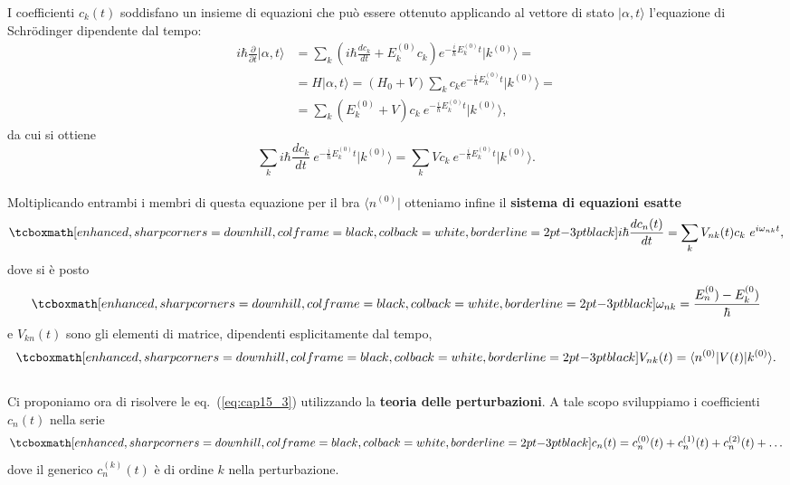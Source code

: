 I coefficienti $c_k (t)$ soddisfano un insieme di equazioni che può essere ottenuto applicando al vettore di stato $\vert \alpha , t \rangle $ l'equazione di Schr\"{o}dinger dipendente dal tempo:
	\begin{align}
		i\hbar \frac{\partial}{\partial t} \vert \alpha , t \rangle &= \sum _ k \left( i\hbar \frac{dc_k}{dt}+ E_k ^{(0)} c_k\right)e^{-\frac{i}{\hbar}E_k ^{(0)} t } \vert k ^{(0)} \rangle =\nonumber \\
		&=  H\vert \alpha , t \rangle  = \left( H_0 + V\right)\sum _k c_ke^{-\frac{i}{\hbar}E_k ^{(0)} t } \vert k ^{(0)} \rangle  = \nonumber \\
		&=   \sum _k \left( E_k ^{(0)}+ V\right)c_k\ e^{-\frac{i}{\hbar}E_k ^{(0)} t } \vert k ^{(0)} \rangle ,
	\end{align}
da cui si ottiene
\begin{equation}
\sum _ k i\hbar \frac{dc_k}{dt} \ e^{-\frac{i}{\hbar}E_k ^{(0)} t } \vert k ^{(0)} \rangle = \sum _ k V c_k\ e^{-\frac{i}{\hbar}E_k ^{(0)} t } \vert k ^{(0)} \rangle .
\end{equation}\\

Moltiplicando entrambi i membri di questa equazione per il bra $\langle n^{(0)} \vert$ otteniamo infine il \textbf{sistema di equazioni esatte}
	\begin{equation}
		\tcboxmath[enhanced, sharp corners=downhill, colframe=black, colback=white, borderline={2pt}{-3pt}{black}]{
			i\hbar \frac{dc_n (t)}{dt} = \sum _ k V_{nk} (t) c_k\ e^{i\omega _{nk}t } ,
			}
	\label{eq:cap15_3}
	\end{equation}
dove si è posto
	\begin{equation}
		\tcboxmath[enhanced, sharp corners=downhill, colframe=black, colback=white, borderline={2pt}{-3pt}{black}]{
			\omega _{nk} = \frac{E_n ^{(0})-E_k ^{(0})}{\hbar}
			}
	\end{equation}
e $V_{kn} (t)$ sono gli elementi di matrice, dipendenti esplicitamente dal tempo,
	\begin{equation}
		\tcboxmath[enhanced, sharp corners=downhill, colframe=black, colback=white, borderline={2pt}{-3pt}{black}]{
			V_{nk} (t) = \langle n ^{(0)} \vert V(t) \vert k ^{(0)} \rangle .
			}
	\end{equation}\\
	
Ci proponiamo ora di risolvere le eq.~(\ref{eq:cap15_3}) utilizzando la \textbf{teoria delle perturbazioni}. A tale scopo sviluppiamo i coefficienti $c_n (t)$ nella serie
	\begin{equation}
		\tcboxmath[enhanced, sharp corners=downhill, colframe=black, colback=white, borderline={2pt}{-3pt}{black}]{
			c_n (t) = c_n ^{(0)}(t)+c_n ^{(1)}(t)+c_n ^{(2)}(t)+\dots
			}
	\end{equation}
dove il generico $c_n ^{(k)}(t)$ è di ordine $k$ nella perturbazione.\\


